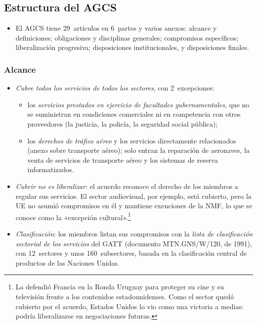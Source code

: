 \documentclass[11pt]{article}
\begin{document}
\subsection{Estructura del AGCS}\label{sec:agcs-estructura}

\begin{itemize}
\item El AGCS tiene 29~artículos en 6~partes y varios anexos\nocite{OMC1994AGCS}: alcance y definiciones; obligaciones y disciplinas generales; compromisos específicos; liberalización progresiva; disposiciones institucionales, y disposiciones finales.
\end{itemize}

\subsubsection{Alcance}\label{sec:alcance}

\begin{itemize}
\item \emph{Cubre todos los servicios de todos los sectores}, con 2~excepciones:
  \begin{itemize}
  \item los \emph{servicios prestados en ejercicio de facultades gubernamentales}, que no se suministran en condiciones comerciales ni en competencia con otros proveedores (la justicia, la policía, la seguridad social pública);
  \item los \emph{derechos de tráfico aéreo} y los servicios directamente relacionados (anexo sobre transporte aéreo); solo entran la reparación de aeronaves, la venta de servicios de transporte aéreo y los sistemas de reserva informatizados.
  \end{itemize}
\item \emph{Cubrir no es liberalizar}: el acuerdo reconoce el derecho de los miembros a regular sus servicios. El sector audiovisual, por ejemplo, está cubierto, pero la UE no asumió compromisos en él y mantiene exenciones de la NMF, lo que se conoce como la «excepción cultural».\footnote{La defendió Francia en la Ronda Uruguay para proteger su cine y su televisión frente a los contenidos estadounidenses. Como el sector quedó cubierto por el acuerdo, Estados Unidos lo vio como una victoria a medias: podría liberalizarse en negociaciones futuras.}
\item \emph{Clasificación}: los miembros listan sus compromisos con la \emph{lista de clasificación sectorial de los servicios} del GATT (documento MTN.GNS/W/120, de 1991), con 12~sectores y unos 160~subsectores, basada en la clasificación central de productos de las Naciones Unidas.
\end{itemize}
\end{document}
